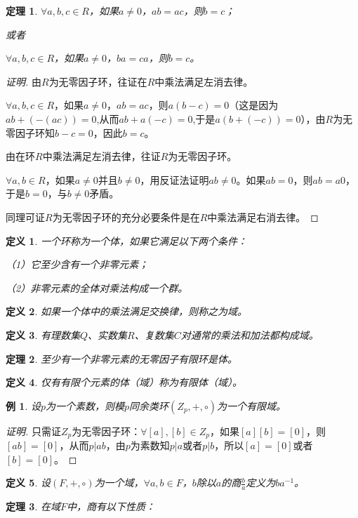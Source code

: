 \documentclass{article}
\newtheorem{Def}{定义}
\newtheorem{Thm}{定理}
\newtheorem*{Example}{例}
\begin{document}
\begin{CJK*}{UTF8}{gbsn}
\begin{Thm}
    $\forall a,b,c\in R$，如果$a\neq 0$，$ab=ac$，则$b=c$；
  
    或者
  
    $\forall a,b,c\in R$，如果$a\neq 0$，$ba=ca$，则$b=c$。
  
  \end{Thm}
  \begin{proof}[证明]
    由$R$为无零因子环，往证在$R$中乘法满足左消去律。
  
    $\forall a,b,c\in R$，如果$a\neq 0$，$ab=ac$，则$a(b-c)=0$（这是因为$ab+(-(ac))=0$,从而$ab+a(-c)=0$,于是$a(b+(-c))=0$），由$R$为无零因子环知$b-c=0$，因此$b=c$。
  
    由在环$R$中乘法满足左消去律，往证$R$为无零因子环。
  
  
    $\forall a,b\in R$，如果$a\neq 0$并且$b\neq 0$，用反证法证明$ab\neq 0$。如果$ab=0$，则$ab=a0$，于是$b=0$，与$b\neq 0$矛盾。
  
    同理可证$R$为无零因子环的充分必要条件是在$R$中乘法满足右消去律。
  \end{proof}
  \begin{Def}
    一个环称为一个体，如果它满足以下两个条件：
  
    （1）它至少含有一个非零元素；
  
    （2）非零元素的全体对乘法构成一个群。
  \end{Def}
  
  \begin{Def}
    如果一个体中的乘法满足交换律，则称之为域。
  \end{Def}
  \begin{Def}
    有理数集$Q$、实数集$R$、复数集$C$对通常的乘法和加法都构成域。
  \end{Def}
  \begin{Thm}
    至少有一个非零元素的无零因子有限环是体。
  \end{Thm}
  \begin{Def}
    仅有有限个元素的体（域）称为有限体（域）。
  \end{Def}
  \begin{Example}
    设$p$为一个素数，则模$p$同余类环$(Z_p,+,\circ)$为一个有限域。
  \end{Example}
  \begin{proof}[证明]
    只需证$Z_p$为无零因子环：$\forall [a],[b]\in Z_p$，如果$[a][b]=[0]$，则$[ab]=[0]$，从而$p|ab$，由$p$为素数知$p|a$或者$p|b$，所以$[a]=[0]$或者$[b]=[0]$。
  \end{proof}
  \begin{Def}
    设$(F,+,\circ)$为一个域，$\forall a,b\in F$，$b$除以$a$的商$\frac{b}{a}$定义为$ba^{-1}$。
  \end{Def}
  \begin{Thm}
    在域$F$中，商有以下性质：
  

\end{Thm}
\end{CJK*}
\end{document}
